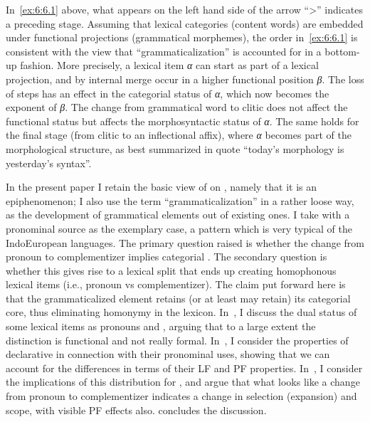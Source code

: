 \documentclass[output=paper]{langsci/langscibook}
\begin{document}
In~\eqref{ex:6:6.1} above, what appears on the left hand side of the arrow
“>” indicates a preceding stage. Assuming that lexical categories (content
words) are embedded under functional projections (grammatical morphemes), the
order in~\eqref{ex:6:6.1} is consistent with the view that
\enquote{grammaticalization} is accounted for in a
bottom-up fashion. More precisely, a lexical item \emph{α} can start as part of
a lexical projection, and by internal merge occur in a higher functional
position \emph{β}. The loss of  steps has an effect in the categorial
status of \emph{α}, which now becomes the exponent of \emph{β}. The change from
grammatical word to clitic does not affect the functional status but affects
the morphosyntactic status of \emph{α}. The same holds for the final stage
(from clitic to an inflectional affix), where \emph{α} becomes part of the
morphological structure, as best summarized in  quote
\enquote{today’s morphology is yesterday’s syntax}.

In the present paper I retain the basic view of \citet{RobRou2003} on
, namely that it is an epiphenomenon; I also use the
term \enquote{grammaticalization} in a rather loose way, as the development of
grammatical elements out of existing ones. I take  with a
pronominal source as the exemplary case, a pattern which is very typical of the
Indo\-Eu\-ro\-pean languages. The primary question raised is whether the change
from pronoun to complementizer implies categorial
. The secondary question is whether this  gives
rise to a lexical split that ends up creating homophonous lexical items (i.e.,
pronoun vs complementizer). The claim put forward here is that the
grammaticalized element retains (or at least may retain) its categorial core,
thus eliminating homonymy in the lexicon.  In~, I discuss
the dual status of some lexical items as pronouns and ,
arguing that to a large extent the distinction is functional and not really
formal. In~, I consider the properties of 
declarative  in connection with their pronominal uses,
showing that we can account for the differences in terms of their \gls{LF} and
\gls{PF} properties. In~, I consider the implications of
this distribution for , and argue that what looks like
a change from pronoun to complementizer indicates a change
in selection (expansion) and scope, with visible \gls{PF} effects also.
 concludes the discussion.
\end{document}
